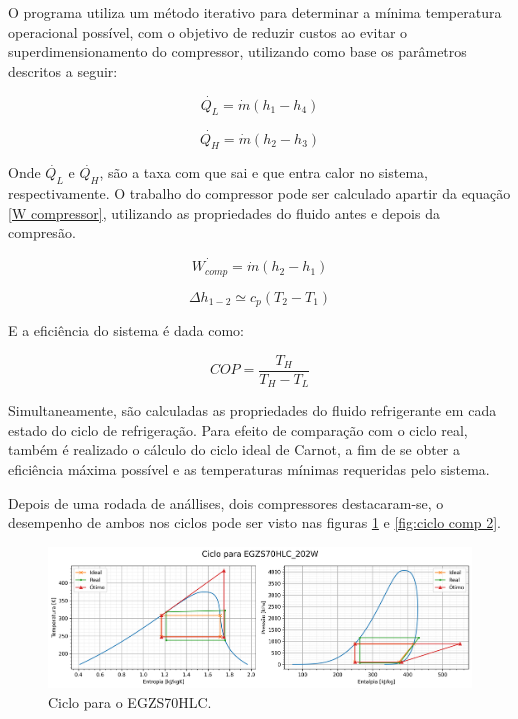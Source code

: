 \newpage

O programa utiliza um método iterativo para determinar a  mínima temperatura operacional possível, com o objetivo de reduzir custos ao evitar o superdimensionamento do compressor, utilizando como base os parâmetros descritos a seguir:

\begin{equation}
    \dot{Q_L} = \dot{m}(h_1-h_4)
    \label{QL}
\end{equation}

\begin{equation}
    \dot{Q_H} = \dot{m}(h_2-h_3)
    \label{QH}
\end{equation}

    Onde $\dot{Q_L}$ e $\dot{Q_H}$, são  a taxa com que sai e que entra calor no sistema, respectivamente. O trabalho do compressor pode ser calculado apartir da equação \ref{W compressor}, utilizando as propriedades do fluido antes e depois da compresão.

\begin{equation}
    \dot{W_{comp}} = \dot{m}(h_2-h_1)
    \label{W compressor}
\end{equation}

\begin{equation}
    \Delta h_{1-2} \simeq  c_p (T_2-T_1)
    \label{simplificacao entalpia}
\end{equation}

    E a eficiência do sistema é dada como:

\begin{equation}
    COP = \frac{T_H}{T_H - T_L}
    \label{COP carnot}
\end{equation}

\newpage    

Simultaneamente, são calculadas as propriedades do fluido refrigerante em cada estado do ciclo de refrigeração. Para efeito de comparação com o ciclo real, também é realizado o cálculo do ciclo ideal de Carnot, a fim de se obter a eficiência máxima possível e as temperaturas mínimas requeridas pelo sistema.

Depois de uma rodada de anállises, dois compressores destacaram-se, o desempenho de ambos nos ciclos pode ser visto nas figuras \ref{fig:ciclo comp 1} e \ref{fig:ciclo comp 2}.

\begin{figure}[ht]
    \centering
    \includegraphics[width=0.9\linewidth]{Imagens/Desenvolvimento/ciclo_EGZS70HLC_202W.png}
    \caption{Ciclo para o EGZS70HLC.}
    \label{fig:ciclo comp 1}
\end{figure}

